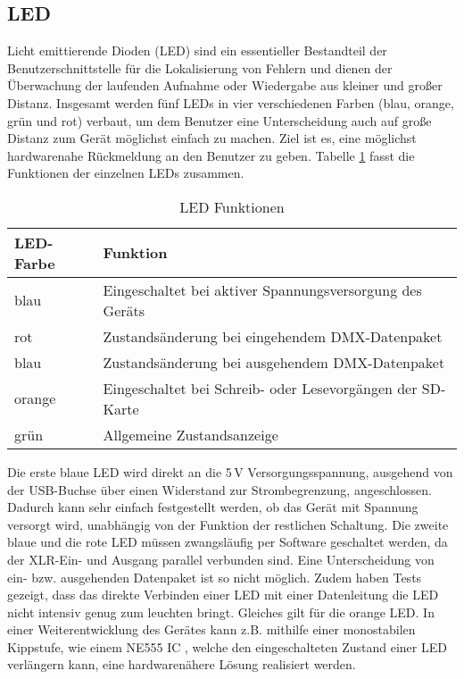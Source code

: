 
\subsection{LED}

Licht emittierende Dioden (LED) sind ein essentieller Bestandteil der Benutzerschnittstelle für die Lokalisierung von Fehlern und dienen der Überwachung der laufenden Aufnahme oder Wiedergabe aus kleiner und großer Distanz. Insgesamt werden fünf LEDs in vier verschiedenen Farben (blau, orange, grün und rot) verbaut, um dem Benutzer eine Unterscheidung auch auf große Distanz zum Gerät möglichst einfach zu machen. Ziel ist es, eine möglichst hardwarenahe Rückmeldung an den Benutzer zu geben. Tabelle \ref{table:LED} fasst die Funktionen der einzelnen LEDs zusammen. 
\begin{table}[h]
	\begin{center}
		\caption{LED Funktionen}
		\begin{tabular}{l | l}
				\textbf{LED-Farbe} & \textbf{Funktion}\\
				\hline
				blau & Eingeschaltet bei aktiver Spannungsversorgung des Geräts\\
				rot & Zustandsänderung bei eingehendem DMX-Datenpaket\\
				blau & Zustandsänderung bei ausgehendem DMX-Datenpaket\\
				orange & Eingeschaltet bei Schreib- oder Lesevorgängen der SD-Karte\\
				grün & Allgemeine Zustandsanzeige
		\end{tabular}
		\label{table:LED}
	\end{center}
\end{table}
Die erste blaue LED wird direkt an die 5\,V Versorgungsspannung, ausgehend von der USB-Buchse über einen Widerstand zur Strombegrenzung, angeschlossen. Dadurch kann sehr einfach festgestellt werden, ob das Gerät mit Spannung versorgt wird, unabhängig von der Funktion der restlichen Schaltung. Die zweite blaue und die rote LED müssen zwangsläufig per Software geschaltet werden, da der XLR-Ein- und Ausgang parallel verbunden sind. Eine Unterscheidung von ein- bzw. ausgehenden Datenpaket ist so nicht möglich. Zudem haben Tests gezeigt, dass das direkte Verbinden einer LED mit einer Datenleitung die LED nicht intensiv genug zum leuchten bringt. Gleiches gilt für die orange LED. In einer Weiterentwicklung des Gerätes kann z.B. mithilfe einer monostabilen Kippstufe, wie einem NE555 IC \cite{NE555}, welche den eingeschalteten Zustand einer LED verlängern kann, eine hardwarenähere Lösung realisiert werden.
